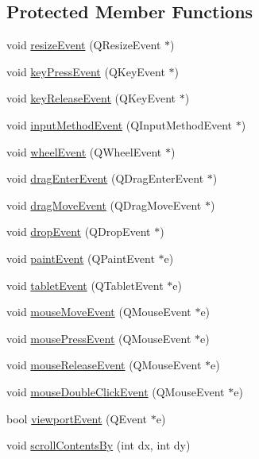 \subsection*{Protected Member Functions}
\begin{DoxyCompactItemize}
\item 
void \hyperlink{classPageView_a8d8f120938a9fbaa4d0e8986af992a74}{resize\+Event} (Q\+Resize\+Event $\ast$)
\item 
void \hyperlink{classPageView_a8cef551480eb211db287352519e84a3c}{key\+Press\+Event} (Q\+Key\+Event $\ast$)
\item 
void \hyperlink{classPageView_a416ecd83bdf4038ffd4b1283341a0101}{key\+Release\+Event} (Q\+Key\+Event $\ast$)
\item 
void \hyperlink{classPageView_a8584d2dfb8f949da288f4f464391fce5}{input\+Method\+Event} (Q\+Input\+Method\+Event $\ast$)
\item 
void \hyperlink{classPageView_a680c6fbb0ccf6f6d92377792e6dfd879}{wheel\+Event} (Q\+Wheel\+Event $\ast$)
\item 
void \hyperlink{classPageView_a24a2a8dd0e07ec65369300adfaf55643}{drag\+Enter\+Event} (Q\+Drag\+Enter\+Event $\ast$)
\item 
void \hyperlink{classPageView_a6b7cf120075ebe3b86606fdf1fb34f0a}{drag\+Move\+Event} (Q\+Drag\+Move\+Event $\ast$)
\item 
void \hyperlink{classPageView_a68c12381b85e43d2677d15a4f2014803}{drop\+Event} (Q\+Drop\+Event $\ast$)
\item 
void \hyperlink{classPageView_a8e574213c4ac3db1304ecf4364a707e6}{paint\+Event} (Q\+Paint\+Event $\ast$e)
\item 
void \hyperlink{classPageView_aa714f5bd13c642ca4429453298c15681}{tablet\+Event} (Q\+Tablet\+Event $\ast$e)
\item 
void \hyperlink{classPageView_a88caca2e12687b9c9e0382cb16926dbb}{mouse\+Move\+Event} (Q\+Mouse\+Event $\ast$e)
\item 
void \hyperlink{classPageView_abb46c86152dad89b8b793859bdc82c8c}{mouse\+Press\+Event} (Q\+Mouse\+Event $\ast$e)
\item 
void \hyperlink{classPageView_ae1bdc30221bd3baa53cba083d7d462e7}{mouse\+Release\+Event} (Q\+Mouse\+Event $\ast$e)
\item 
void \hyperlink{classPageView_a9a2f4dac193b1e075ceec67299883076}{mouse\+Double\+Click\+Event} (Q\+Mouse\+Event $\ast$e)
\item 
bool \hyperlink{classPageView_a7d0b1b783db9b550d2b5bafe88ef5bb6}{viewport\+Event} (Q\+Event $\ast$e)
\item 
void \hyperlink{classPageView_a4e8b9b0b64ce87e74a8caed93b22ce7d}{scroll\+Contents\+By} (int dx, int dy)
\end{DoxyCompactItemize}


